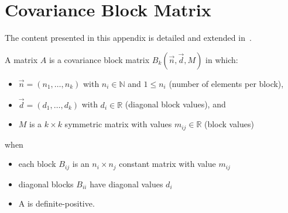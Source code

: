 \documentclass[11pt,fleqn]{book} %
\begin{document}
\section{Covariance Block Matrix}
\label{ap:cbm}

The content presented in this appendix is detailed and extended 
in~\cite{torrent:2011}.

\begin{definition}
	A matrix $A$ is a covariance block matrix $B_k(\vec{n},\vec{d},M)$
	in which:
	\begin{itemize}
		\item $\vec{n}=(n_1,\dots,n_k)$ with $n_i \in \mathbb{N}$ and $1 \le n_i$ (number of elements per block),
		\item $\vec{d}=(d_1,\dots,d_k)$ with $d_i \in \mathbb{R}$ (diagonal block values), and
		\item $M$ is a $k {\times} k$ symmetric matrix with values $m_{ij} \in \mathbb{R}$ (block values)
	\end{itemize}
	when
	\begin{itemize}
		\item each block $B_{ij}$ is an $n_i {\times} n_j$ constant matrix with value $m_{ij}$
		\item diagonal blocks $B_{ii}$ have diagonal values $d_i$
		\item A is definite-positive.
	\end{itemize}
\end{definition}
\end{document}

